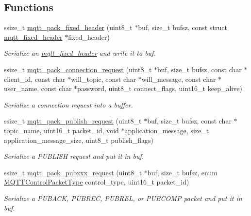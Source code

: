 \subsection*{Functions}
\begin{DoxyCompactItemize}
\item 
ssize\+\_\+t \hyperlink{group__packers_ga52d369e6e7d44539aab6732375288623}{mqtt\+\_\+pack\+\_\+fixed\+\_\+header} (uint8\+\_\+t $\ast$buf, size\+\_\+t bufsz, const struct \hyperlink{structmqtt__fixed__header}{mqtt\+\_\+fixed\+\_\+header} $\ast$fixed\+\_\+header)
\begin{DoxyCompactList}\small\item\em Serialize an \hyperlink{structmqtt__fixed__header}{mqtt\+\_\+fixed\+\_\+header} and write it to {\ttfamily buf}. \end{DoxyCompactList}\item 
ssize\+\_\+t \hyperlink{group__packers_ga0ed22cd47cf955e07e9662f1d9a4989c}{mqtt\+\_\+pack\+\_\+connection\+\_\+request} (uint8\+\_\+t $\ast$buf, size\+\_\+t bufsz, const char $\ast$client\+\_\+id, const char $\ast$will\+\_\+topic, const char $\ast$will\+\_\+message, const char $\ast$user\+\_\+name, const char $\ast$password, uint8\+\_\+t connect\+\_\+flags, uint16\+\_\+t keep\+\_\+alive)
\begin{DoxyCompactList}\small\item\em Serialize a connection request into a buffer. \end{DoxyCompactList}\item 
ssize\+\_\+t \hyperlink{group__packers_gae7cb4c4d90ed04fe268f5f9a167e32b1}{mqtt\+\_\+pack\+\_\+publish\+\_\+request} (uint8\+\_\+t $\ast$buf, size\+\_\+t bufsz, const char $\ast$topic\+\_\+name, uint16\+\_\+t packet\+\_\+id, void $\ast$application\+\_\+message, size\+\_\+t application\+\_\+message\+\_\+size, uint8\+\_\+t publish\+\_\+flags)
\begin{DoxyCompactList}\small\item\em Serialize a P\+U\+B\+L\+I\+SH request and put it in {\ttfamily buf}. \end{DoxyCompactList}\item 
ssize\+\_\+t \hyperlink{group__packers_ga9cbd954d6bffd8fb0a06a6e4d34e4949}{mqtt\+\_\+pack\+\_\+pubxxx\+\_\+request} (uint8\+\_\+t $\ast$buf, size\+\_\+t bufsz, enum \hyperlink{group__unpackers_gacbd36b88ec7f62bc161b07e1a0aed679}{M\+Q\+T\+T\+Control\+Packet\+Type} control\+\_\+type, uint16\+\_\+t packet\+\_\+id)
\begin{DoxyCompactList}\small\item\em Serialize a P\+U\+B\+A\+CK, P\+U\+B\+R\+EC, P\+U\+B\+R\+EL, or P\+U\+B\+C\+O\+MP packet and put it in {\ttfamily buf}. \end{DoxyCompactList}\item 

\end{DoxyCompactItemize}

